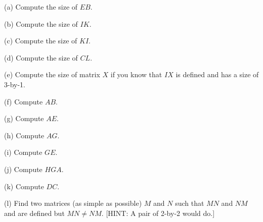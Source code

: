 (a) Compute the size of $EB$.

(b) Compute the size of $IK$.

(c) Compute the size of $KI$.

(d) Compute the size of $CL$.

(e) Compute the size of matrix $X$ if you know that $IX$ 
is defined and has a size of 3-by-1.

(f) Compute $AB$.

(g) Compute $AE$.

(h) Compute $AG$.

(i) Compute $GE$.

(j) Compute $HGA$.

(k) Compute $DC$.

(l) Find two matrices (as simple as possible) $M$ and $N$ such that
$MN$ and $NM$ and are defined but $MN \neq NM$.
[HINT: A pair of 2-by-2 would do.]





